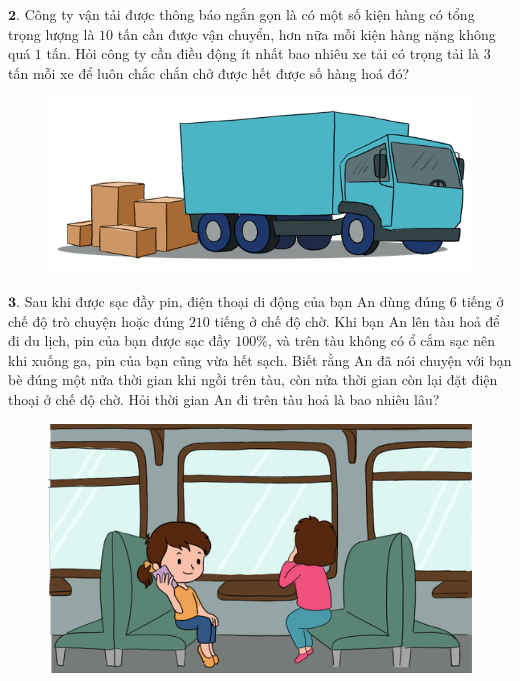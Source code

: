 \begin{multicols}{2}
	$\pmb{2.}$ Công ty vận tải được thông báo ngắn gọn là có một số kiện hàng có tổng trọng lượng là $10$ tấn cần được vận chuyển, hơn nữa mỗi kiện hàng nặng không quá $1$ tấn. Hỏi công ty  cần điều động ít nhất bao nhiêu xe tải có trọng tải là $3$ tấn mỗi xe để luôn chắc chắn chở được hết được số hàng hoá đó?
	\begin{figure}[H]
		\centering
		\vspace*{-10pt}
		\captionsetup{labelformat= empty, justification=centering}
		\includegraphics[width=0.8\linewidth]{Pi5_bai2}
		\vspace*{-15pt}
	\end{figure}
	$\pmb{3.}$ Sau khi được sạc đầy pin, điện thoại di động của bạn An dùng đúng $6$ tiếng ở chế độ trò chuyện hoặc đúng $210$ tiếng ở chế độ chờ. Khi bạn An lên tàu hoả để đi du lịch, pin của bạn được sạc đầy $100\%$, và trên tàu không có ổ cắm sạc nên khi xuống ga, pin của bạn cũng vừa hết sạch. Biết rằng An đã nói chuyện với bạn bè đúng một nửa thời gian khi ngồi trên tàu, còn nửa thời gian còn lại đặt điện thoại ở chế độ chờ. Hỏi thời gian An đi trên tàu hoả là bao nhiêu lâu?
	\begin{figure}[H]
		\centering
		\vspace*{-5pt}
		\captionsetup{labelformat= empty, justification=centering}
		\includegraphics[width=0.85\linewidth]{Pi5_bai3}
		\vspace*{-10pt}
	\end{figure}

\end{multicols}
